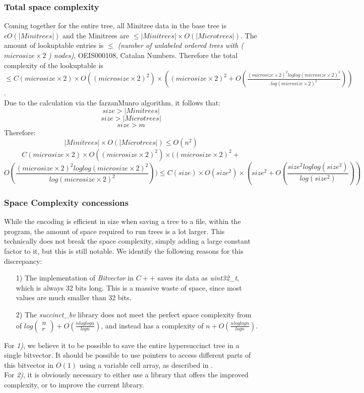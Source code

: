 \documentclass{article}
\begin{document}
\subsubsection{Total space complexity}
Coming together for the entire tree, all Minitree data in the base tree is $\epsilon O(|Minitrees|)$ and the Minitrees are $ \leq |Minitrees| \times O(|Microtrees|)$. 
The amount of lookuptable entries is $\leq$ \textit{(number of unlabeled ordered trees with (} $microsize \times 2$ \textit{) nodes)}, OEIS000108, Catalan Numbers. Therefore the total complexity of the lookuptable is $\leq C(microsize \times 2) \times O((microsize \times 2)^{2}) \times ((microsize \times 2)^{2} + O(\frac{(microsize \times 2)^{2} log log (microsize \times 2)^{2}}{log (microsize \times 2)^{2}}))$.\\
Due to the calculation via the farzanMunro algorithm, it follows that:
$$size > |Minitrees|$$
$$size > |Microtrees|$$
$$size > m$$
Therefore:
$$|Minitrees| \times O(|Microtrees|) \leq O(n^{2})$$
$$C(microsize \times 2) \times O((microsize \times 2)^{2}) \times ((microsize \times 2)^{2} +$$ $$O(\frac{(microsize \times 2)^{2} log log (microsize \times 2)^{2}}{log (microsize \times 2)^{2}})) \leq C(size) \times O(size^{2}) \times (size^{2} + O(\frac{size^{2} log log (size^{2})}{log (size^{2})}))$$



\subsubsection{Space Complexity concessions}
While the encoding is efficient in size when saving a tree to a file, within the program, the amount of space required to run trees is a lot larger. This technically does not break the space complexity, simply adding a large constant factor to it, but this is still notable. We identify the following reasons for this discrepancy:\\
\begin{itemize}
	\item[1)] The implementation of \textit{Bitvector} in $C++$ saves its data as \textit{uint32\_t}, which is always 32 bits long. This is a massive waste of space, since most values are much smaller than 32 bits.
	\item[2)] The \textit{succinct\_bv} library does not meet the perfect space complexity from \cite{succinctBV} of $log(\begin{array}{c} n \\ r \end{array}) + O(\frac{n log log n}{log n})$, and instead has a complexity of $n + O(\frac{n log log n}{log n})$.
\end{itemize}
For \textit{1)}, we believe it to be possible to save the entire hypersuccinct tree in a single bitvector. It should be possible to use pointers to access different parts of this bitvector in $O(1)$ using a variable cell array, as described in \cite{universalSuccinct}.\\
For \textit{2)}, it is obviously necessary to either use a library that offers the improved complexity, or to improve the current library.
\end{document}
